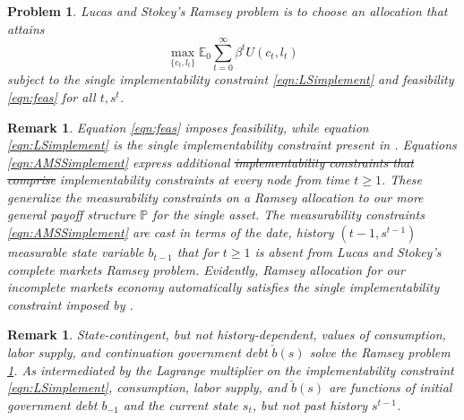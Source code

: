 \documentclass[12pt]{article}
\newcommand{\EE}{\mathbb E}
\newtheorem{remark}[theorem]{Remark}
\newtheorem{problem}[theorem]{Problem}
\begin{document}
\begin{problem}\label{prob:RamseyLS}
Lucas and Stokey's Ramsey problem is to choose an allocation %
that attains %
\begin{equation}\label{eqn:RamseyobjLS}
\max_{\{c_t,l_t\}} \EE_0\sum_{t=0}^\infty \beta^t U(c_t,l_t)
 \end{equation}
 subject to the single implementability constraint \eqref{eqn:LSimplement} and feasibility \eqref{eqn:feas} for all $t, s^t$.
\end{problem}

\begin{remark} Equation \eqref{eqn:feas} imposes feasibility, while equation  \eqref{eqn:LSimplement} is the single implementability constraint
present in \citet{LucasJr.1983}.  Equations \eqref{eqn:AMSSimplement} express  additional \st{implementability constraints that comprise} implementability constraints at every node from time $t \geq 1$. These generalize the \citet{Aiyagari2002} measurability constraints on a Ramsey allocation  to our more general payoff structure ${\mathbb P}$ for the
single asset. The measurability constraints \eqref{eqn:AMSSimplement}  are cast
in terms of the date, history $(t-1, s^{t-1})$ measurable state variable $b_{t-1}$ that for $t \geq 1$ is absent from Lucas and Stokey's complete markets Ramsey problem.  Evidently, Ramsey allocation for our incomplete markets economy automatically satisfies the single implementability constraint imposed by \citeauthor{LucasJr.1983}.
\end{remark}


\begin{remark}\label{rem:LSdebt}
State-contingent, but not history-dependent,  values of consumption, labor supply, and continuation government debt $\check b(s)$ solve the \citet{LucasJr.1983} Ramsey problem \ref{prob:RamseyLS}.  As intermediated by the Lagrange multiplier on the implementability constraint \eqref{eqn:LSimplement},
consumption, labor supply, and $\check b(s)$ are  functions of initial government debt $b_{-1}$ and the current state $s_t$, but not past history $s^{t-1}$.
\end{remark}
\end{document}

